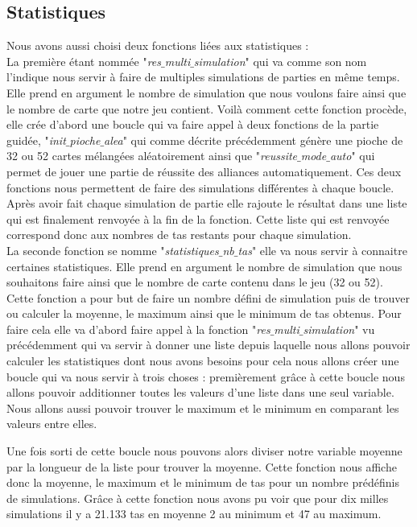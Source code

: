 \documentclass[10pt,a4paper,french,titlepage]{article}
\theoremstyle{definition}
\begin{document}
\subsection{Statistiques}
Nous avons aussi choisi deux fonctions liées aux statistiques : \\
La première étant nommée "\textit{res$\_$multi$\_$simulation}" qui va comme son nom l'indique nous servir à faire de multiples simulations de parties en même temps. Elle prend en argument le nombre de simulation que nous voulons faire ainsi que le nombre de carte que notre jeu contient. Voilà comment cette fonction procède, elle crée d'abord une boucle qui va faire appel à deux fonctions de la partie guidée, "\textit{init$\_$pioche$\_$alea}" qui comme décrite précédemment génère une pioche de 32 ou 52 cartes mélangées aléatoirement ainsi que "\textit{reussite$\_$mode$\_$auto}" qui permet de jouer une partie de réussite des alliances automatiquement. Ces deux fonctions nous permettent de faire des simulations différentes à chaque boucle. Après avoir fait chaque simulation de partie elle rajoute le résultat dans une liste qui est finalement renvoyée à la fin de la fonction. Cette liste qui est renvoyée correspond donc aux nombres de tas restants pour chaque simulation.\\

La seconde fonction se nomme "\textit{statistiques$\_$nb$\_$tas}" elle va nous servir à connaitre certaines statistiques. Elle prend en argument le nombre de simulation que nous souhaitons faire ainsi que le nombre de carte contenu dans le jeu (32 ou 52). Cette fonction a pour but de faire un nombre défini de simulation puis de trouver ou calculer la moyenne, le maximum ainsi que le minimum de tas obtenus. Pour faire cela elle va d'abord faire appel à la fonction "\textit{res$\_$multi$\_$simulation}" vu précédemment qui va servir à donner une liste depuis laquelle nous allons pouvoir calculer les statistiques dont nous avons besoins pour cela nous allons créer une boucle qui va nous servir à trois choses : premièrement grâce à cette boucle nous allons pouvoir additionner toutes les valeurs d'une liste dans une seul variable. Nous allons aussi pouvoir trouver le maximum et le minimum en comparant les valeurs entre elles.

Une fois sorti de cette boucle nous pouvons alors diviser notre variable moyenne par la longueur de la liste pour trouver la moyenne. Cette fonction nous affiche donc la moyenne, le maximum et le minimum de tas pour un nombre prédéfinis de simulations. Grâce à cette fonction nous avons pu voir que pour dix milles simulations il y a 21.133 tas en moyenne 2 au minimum et 47 au maximum.
\end{document}
